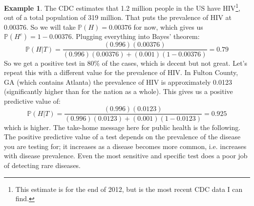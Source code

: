 \documentclass[12pt]{article}
\theoremstyle{definition}
\newtheorem*{example}{Example}
\theoremstyle{remark}
\def\P{{\mathbb P}}
\begin{document}
\begin{example}
The CDC estimates that 1.2 million people in the US have HIV\footnote{This estimate is for the end of 2012, but is the most recent CDC data I can find.}, out of a total population of 319 million. That puts the prevalence of HIV at 0.00376. So we will take $\P(H) = 0.00376$ for now, which gives us $\P(H^c) = 1 - 0.00376$. Plugging everything into Bayes' theorem:
\[
\P(H|T) = \frac{ (0.996)(0.00376)}{ (0.996)(0.00376) + (0.001)(1 - 0.00376) } = 0.79
\] 
So we get a positive test in 80\% of the cases, which is decent but not great. Let's repeat this with a different value for the prevalence of HIV. In Fulton County, GA (which contains Atlanta) the prevalence of HIV is approximately 0.0123 (significantly higher than for the nation as a whole). This gives us a positive predictive value of:
\[
\P(H|T) = \frac{ (0.996)(0.0123)}{ (0.996)(0.0123) + (0.001)(1 - 0.0123) } = 0.925
\]
which is higher. The take-home message here for public health is the following. The positive predictive value of a  test depends on the prevalence of the disease you are testing for; it increases as a disease becomes more common, i.e. increases with disease prevalence. Even the most sensitive and specific test does a poor job of detecting rare diseases.
\end{example}
\end{document}
